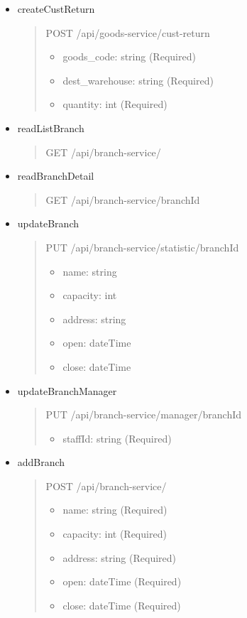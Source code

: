 \begin{itemize}
	\item createCustReturn
	      \begin{quote}
		      POST /api/goods-service/cust-return
		      \begin{itemize}
			      \item goods\_code: string (Required)
			      \item dest\_warehouse: string (Required)
			      \item quantity: int (Required)
		      \end{itemize}
	      \end{quote}
\end{itemize}

\begin{itemize}
	\item readListBranch
	      \begin{quote}
		      GET /api/branch-service/
	      \end{quote}


	\item readBranchDetail
	      \begin{quote}
		      GET /api/branch-service/{branchId}
	      \end{quote}

	\item updateBranch
	      \begin{quote}
		      PUT /api/branch-service/statistic/{branchId}
		      \begin{itemize}
			      \item name: string
			      \item capacity: int
			      \item address: string
			      \item open: dateTime
			      \item close: dateTime
		      \end{itemize}
	      \end{quote}

	\item updateBranchManager
	      \begin{quote}
		      PUT /api/branch-service/manager/{branchId}
		      \begin{itemize}
			      \item staffId: string (Required)
		      \end{itemize}
	      \end{quote}

	\item addBranch
	      \begin{quote}
		      POST /api/branch-service/
		      \begin{itemize}
			      \item name: string (Required)
			      \item capacity: int (Required)
			      \item address: string (Required)
			      \item open: dateTime (Required)
			      \item close: dateTime (Required)
		      \end{itemize}
	      \end{quote}


\end{itemize}
